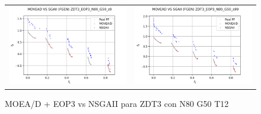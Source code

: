 \begin{figure}[H]
\begin{tabular}{c c}
    \includegraphics[scale=0.5]{figures/ZDT3_EOP3_N80_G50_T12/s9_comp.png} &
    \includegraphics[scale=0.5]{figures/ZDT3_EOP3_N80_G50_T12/s99_comp.png}\\
    \end{tabular}
    \caption{\centering MOEA/D + EOP3 vs NSGAII para ZDT3 con N80 G50 T12}
    \label{fig:9}
\end{figure}


